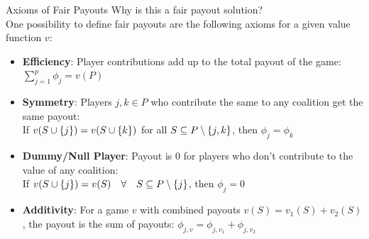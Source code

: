 \documentclass[11pt,compress,t,notes=noshow, aspectratio=169, xcolor=table]{beamer}
\begin{document}
\begin{frame}{Axioms of Fair Payouts}
 Why is this a fair payout solution?
 \\
 One possibility to define fair payouts are the following axioms for a given value function $v$:
  \vspace{0.25cm}
  \begin{itemize}[<+->]
  \itemsep1em
    \item \textbf{Efficiency}: Player contributions add up to the total payout of the game:
      $\sum\nolimits_{j=1}^p\phi_j = v(P)$
    \item \textbf{Symmetry}: Players $j,k \in P$ who contribute the same to any coalition get the same payout: \\ 
      If $v(\Scupj) = v(\Scupk)$ for all $\SsubP \setminus\{j,k\}$, then $\phi_j=\phi_k$
    \item \textbf{Dummy/Null Player}: Payout is 0 for players who don't contribute to the value of any coalition: \\
      If $v(\Scupj)=v(S)\quad  \forall \quad \SsubP \setminus \{j\}$, then $\phi_j=0$
    \item \textbf{Additivity}: For a game $v$ with combined payouts $v(S) = v_1(S) + v_2(S)$, the payout is the sum of payouts: $\phi_{j,v} = \phi_{j,v_1} + \phi_{j, v_2}$
  \end{itemize}
  \vspace{0.5cm}
  

\end{frame}
\end{document}
